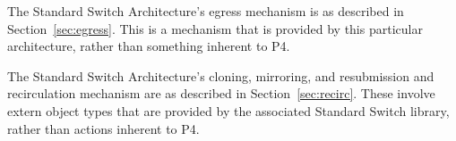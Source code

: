 \documentclass[12pt]{article}
\begin{document}
The Standard Switch Architecture's egress mechanism is as described
in Section~\ref{sec:egress}.  This is a mechanism that is provided by
this particular architecture, rather than something inherent to P4.


The Standard Switch Architecture's cloning, mirroring, and resubmission
and recirculation mechanism are as described in Section~\ref{sec:recirc}.
These involve extern object types that are provided by the associated
Standard Switch library, rather than actions inherent to P4.
\end{document}
